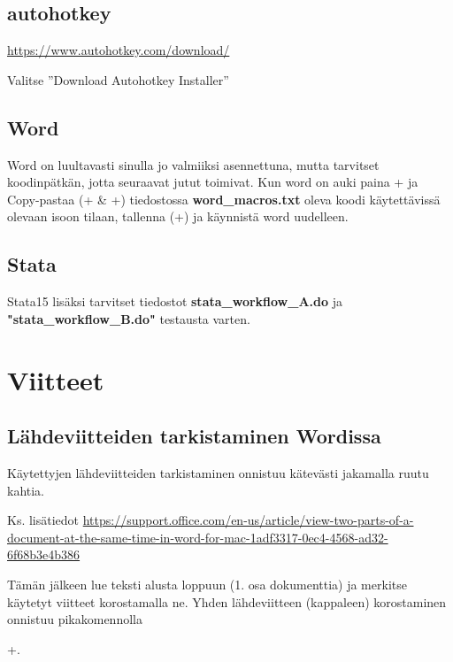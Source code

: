 \documentclass[a5paper,9pt]{scrartcl}
\begin{document}
    \subsection{autohotkey}
    \url{https://www.autohotkey.com/download/}
    
    Valitse ''Download Autohotkey Installer''
    \subsection{Word}
    Word on luultavasti sinulla  jo valmiiksi asennettuna, mutta tarvitset koodinpätkän, jotta seuraavat jutut toimivat. Kun word on auki paina + ja Copy-pastaa (+ \& +) tiedostossa \textbf{word\_macros.txt} oleva koodi käytettävissä olevaan isoon tilaan, tallenna (+) ja käynnistä word uudelleen.
    
    \subsection{Stata}
    Stata15 lisäksi tarvitset tiedostot \textbf{stata\_workflow\_A.do} ja \textbf{"stata\_workflow\_B.do"} testausta varten. 

    
    \section{Viitteet}
    \subsection{Lähdeviitteiden tarkistaminen Wordissa}
    Käytettyjen lähdeviitteiden tarkistaminen onnistuu kätevästi jakamalla ruutu kahtia.
    
    
    
    Ks. lisätiedot \url{https://support.office.com/en-us/article/view-two-parts-of-a-document-at-the-same-time-in-word-for-mac-1adf3317-0ec4-4568-ad32-6f68b3e4b386}
    
    Tämän jälkeen lue teksti alusta loppuun (1. osa dokumenttia) ja merkitse käytetyt viitteet korostamalla ne. Yhden lähdeviitteen (kappaleen) korostaminen onnistuu pikakomennolla
    
    +. 
    
\end{document}
